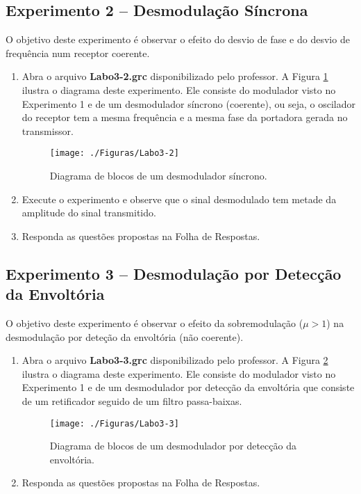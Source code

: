\documentclass[12pt,addpoints]{exam}
\newcommand{\myscale}{0.4}
\begin{document}
\subsection{Experimento 2 -- Desmodulação Síncrona}

O objetivo deste experimento é observar o efeito do desvio de fase e do desvio de frequência num receptor coerente.

\begin{enumerate}
    \item  Abra o arquivo \textbf{Labo3-2.grc} disponibilizado pelo professor. A Figura \ref{fig:GRC_3-1b} ilustra o diagrama deste experimento. Ele consiste do modulador visto no Experimento 1 e de um desmodulador síncrono (coerente), ou seja, o oscilador do receptor tem a mesma frequência e a mesma fase da portadora gerada no transmissor. 
    \begin{figure}[htb]
        \centering
        \texttt{[image: ./Figuras/Labo3-2]}
        \caption{Diagrama de blocos de um desmodulador síncrono.} 
        \label{fig:GRC_3-1b}
    \end{figure}
  \item Execute o experimento e observe que o sinal desmodulado tem metade da amplitude do sinal transmitido.
  \item Responda as questões propostas na Folha de Respostas.
\end{enumerate}

\subsection{Experimento 3 -- Desmodulação por Detecção da Envoltória}

O objetivo deste experimento é observar o efeito da sobremodulação ($\mu > 1$) na desmodulação por deteção da envoltória (não coerente).

\begin{enumerate}
    \item  Abra o arquivo \textbf{Labo3-3.grc} disponibilizado pelo professor. A Figura \ref{fig:GRC_3-1c} ilustra o diagrama deste experimento. Ele consiste do modulador visto no Experimento 1 e de um desmodulador por detecção da envoltória que consiste de um retificador seguido de um filtro passa-baixas.
    \begin{figure}[htb]
        \centering
        \texttt{[image: ./Figuras/Labo3-3]}
        \caption{Diagrama de blocos de um desmodulador por detecção da envoltória.} 
        \label{fig:GRC_3-1c}
    \end{figure}
  \item Responda as questões propostas na Folha de Respostas.
\end{enumerate}
\end{document}
